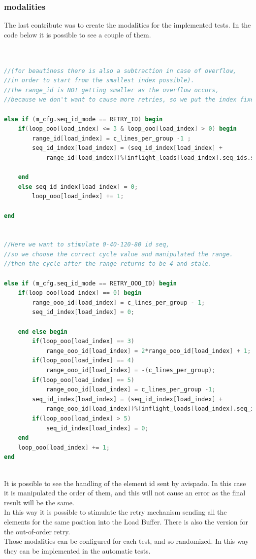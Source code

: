 \subsubsection{modalities}
The last contribute was to create the modalities for the implemented tests. In the code below it is possible to see a couple of them.\\


\begin{lstlisting}[language=Verilog,style=verilog-style, backgroundcolor=\color{lyel_palette}, frame=tlb]


//(for beautiness there is also a subtraction in case of overflow, 
//in order to start from the smallest index possible).
//The range_id is NOT getting smaller as the overflow occurs, 
//because we don't want to cause more retries, so we put the index fixed to 0

else if (m_cfg.seq_id_mode == RETRY_ID) begin
    if(loop_ooo[load_index] <= 3 & loop_ooo[load_index] > 0) begin
        range_id[load_index] = c_lines_per_group -1 ;
        seq_id_index[load_index] = (seq_id_index[load_index] +
            range_id[load_index])%(inflight_loads[load_index].seq_ids.size());
            
    end
    else seq_id_index[load_index] = 0;
        loop_ooo[load_index] += 1;
        
end


//Here we want to stimulate 0-40-120-80 id seq, 
//so we choose the correct cycle value and manipulated the range.
//then the cycle after the range returns to be 4 and stale.

else if (m_cfg.seq_id_mode == RETRY_OOO_ID) begin
    if(loop_ooo[load_index] == 0) begin
        range_ooo_id[load_index] = c_lines_per_group - 1;
        seq_id_index[load_index] = 0;

    end else begin
        if(loop_ooo[load_index] == 3) 
            range_ooo_id[load_index] = 2*range_ooo_id[load_index] + 1;
        if(loop_ooo[load_index] == 4) 
            range_ooo_id[load_index] = -(c_lines_per_group);
        if(loop_ooo[load_index] == 5) 
            range_ooo_id[load_index] = c_lines_per_group -1;
        seq_id_index[load_index] = (seq_id_index[load_index] +
            range_ooo_id[load_index])%(inflight_loads[load_index].seq_ids.size());
        if(loop_ooo[load_index] > 5) 
            seq_id_index[load_index] = 0;
    end
    loop_ooo[load_index] += 1;
end



\end{lstlisting}

It is possible to see the handling of the element id sent by avispado. In this case it is manipulated the order of them, and this will not cause an error as the final result will be the same.\\

In this way it is possible to stimulate the retry mechanism sending all the elements for the same position into the Load Buffer. There is also the version for the out-of-order retry.\\

Those modalities can be configured for each test, and so randomized. In this way they can be implemented in the automatic tests.
